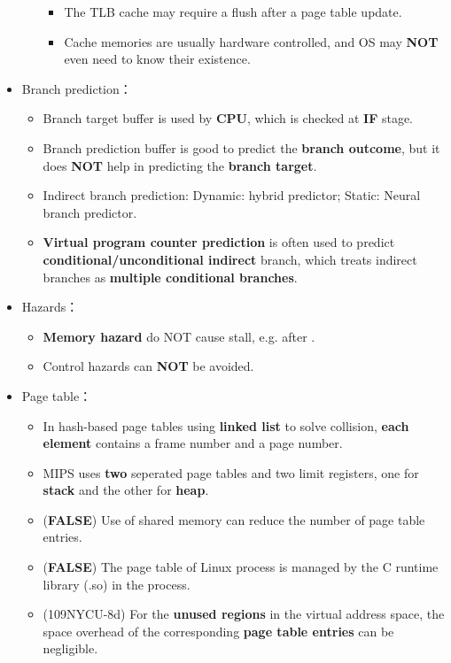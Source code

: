\begin{itemize}
\begin{itemize}
\begin{itemize}
        \item The TLB cache may require a flush after a page table update.
        \item Cache memories are usually hardware controlled, and OS may \textbf{NOT} even need to know their existence.
    \end{itemize}
    \end{itemize}
    \item Branch prediction： \begin{itemize}
        \item Branch target buffer is used by \textbf{CPU}, which is checked at \textbf{IF} stage.
        \item Branch prediction buffer is good to predict the \textbf{branch outcome}, but it does \textbf{NOT} help in predicting the \textbf{branch target}.
        \item Indirect branch prediction: Dynamic: hybrid predictor; Static: Neural branch predictor.
        \item \textbf{Virtual program counter prediction} is often used to predict \textbf{conditional/unconditional indirect} branch, which treats indirect branches as \textbf{multiple conditional branches}.
    \end{itemize}
    \item Hazards： \begin{itemize}
        \item \textbf{Memory hazard} do NOT cause stall, e.g.  after .
        \item Control hazards can \textbf{NOT} be avoided.
    \end{itemize}
    \item Page table： \begin{itemize}
        \item In hash-based page tables using \textbf{linked list} to solve collision, \textbf{each element} contains a frame number and a page number.
        \item MIPS uses \textbf{two} seperated page tables and two limit registers, one for \textbf{stack} and the other for \textbf{heap}.
        \item (\textbf{FALSE}) Use of shared memory can reduce the number of page table entries.
        \item (\textbf{FALSE}) The page table of Linux process is managed by the C runtime library (.so) in the process.
        \item (109NYCU-8d) For the \textbf{unused regions} in the virtual address space, the space overhead of the corresponding \textbf{page table entries} can be negligible.

\end{itemize}
\end{itemize}
